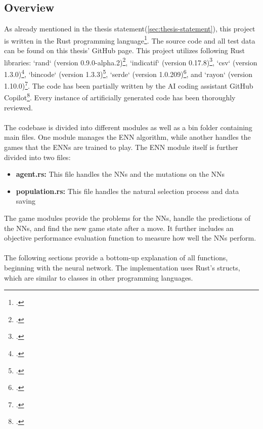 \documentclass[11pt]{report}
\begin{document}
\begin{enumerate}
    \subsection{Overview}\label{subsec:overview}
    As already mentioned in the thesis statement(\ref{sec:thesis-statement}), this project is written in the Rust programming language\footcite{rust23}.
    The source code and all test data can be found on this thesis' GitHub page. %
    This project utilizes following Rust libraries:
    `rand` (version 0.9.0-alpha.2)\footcite{rand2024},
    `indicatif` (version 0.17.8)\footcite{indicatif2023},
    `csv` (version 1.3.0)\footcite{csv2023},
    `bincode` (version 1.3.3)\footcite{bincode2021},
    `serde` (version 1.0.209)\footcite{serde2024},
    and `rayon` (version 1.10.0)\footcite{rayon2023}.
    The code has been partially written by the AI coding assistant GitHub Copilot\footcite{github_copilot2021}.
    Every instance of artificially generated code has been thoroughly reviewed.
    \\ \\
    The codebase is divided into different modules as well as a bin folder containing main files.
    One module manages the ENN algorithm, while another handles the games that the ENNs are trained to play.
    The ENN module itself is further divided into two files:
    \begin{itemize}
        \item \textbf{agent.rs:} This file handles the NNs and the mutations on the NNs
        \item \textbf{population.rs:} This file handles the natural selection process and data saving
    \end{itemize}
    The game modules provide the problems for the NNs, handle the predictions of the NNs, and find the new game state after a move.
    It further includes an objective performance evaluation function to measure how well the NNs perform.
    \\ \\
    The following sections provide a bottom-up explanation of all functions, beginning with the neural network.
    The implementation uses Rust's structs, which are similar to classes in other programming languages.


\end{enumerate}
\end{document}
